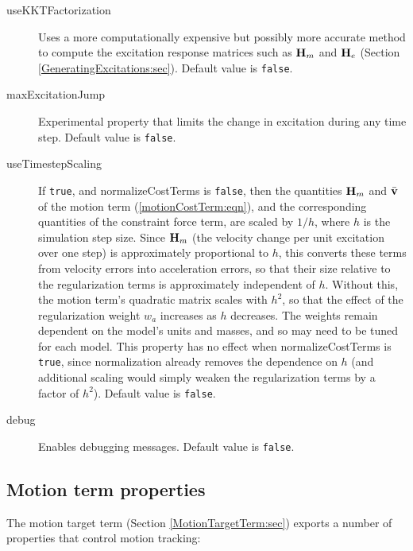 \begin{description}
\item[useKKTFactorization]\mbox{}

Uses a more computationally expensive but possibly more accurate method to
compute the excitation response matrices such as ${\bf H}_m$ and ${\bf H}_e$
(Section \ref{GeneratingExcitations:sec}). Default value is {\tt false}.

\item[maxExcitationJump]\mbox{}

Experimental property that limits the change in excitation during any time
step. Default value is {\tt false}.

\item[useTimestepScaling]\mbox{}

If {\tt true}, and {\sf normalizeCostTerms} is {\tt false}, then the
quantities ${\bf H}_m$ and $\bar{{\bf v}}$ of the motion term
(\ref{motionCostTerm:eqn}), and the corresponding quantities of the
constraint force term, are scaled by $1/h$, where $h$ is the simulation step
size. Since ${\bf H}_m$ (the
velocity change per unit excitation over one step) is approximately
proportional to $h$, this converts these terms from velocity errors into
acceleration errors, so that their size relative to the regularization terms
is approximately independent of $h$. Without this, the motion term's
quadratic matrix scales with $h^2$, so that the effect of the regularization
weight $w_a$ increases as $h$ decreases. The weights remain dependent on the
model's units and masses, and so may need to be tuned for each model.
This property has no effect when {\sf normalizeCostTerms} is {\tt true},
since normalization already removes the dependence on $h$
(and additional scaling would simply weaken the regularization terms by a
factor of $h^2$). Default value is {\tt false}.

\item[debug]\mbox{}

Enables debugging messages. Default value is {\tt false}.

\end{description}

\subsection{Motion term properties}
\label{MotionTermProperties:sec}

The motion target term (Section \ref{MotionTargetTerm:sec}) exports a number of
properties that control motion tracking:

